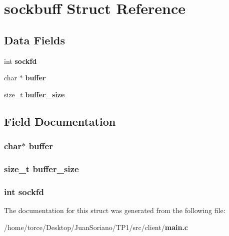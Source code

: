 \section{sockbuff Struct Reference}
\label{structsockbuff}
\subsection*{Data Fields}
\begin{DoxyCompactItemize}
\item 
int {\bf sockfd}
\item 
char $\ast$ {\bf buffer}
\item 
size\+\_\+t {\bf buffer\+\_\+size}
\end{DoxyCompactItemize}


\subsection{Field Documentation}
\subsubsection[{buffer}]{\setlength{\rightskip}{0pt plus 5cm}char$\ast$ buffer}\label{structsockbuff_aff2566f4c366b48d73479bef43ee4d2e}
\subsubsection[{buffer\+\_\+size}]{\setlength{\rightskip}{0pt plus 5cm}size\+\_\+t buffer\+\_\+size}\label{structsockbuff_a799a743b3abd553a37fc01ad3097df08}
\subsubsection[{sockfd}]{\setlength{\rightskip}{0pt plus 5cm}int sockfd}\label{structsockbuff_ad2c8fb3df3a737e0685e902870a611d2}


The documentation for this struct was generated from the following file\+:\begin{DoxyCompactItemize}
\item 
/home/torce/\+Desktop/\+Juan\+Soriano/\+T\+P1/src/client/{\bf main.\+c}\end{DoxyCompactItemize}
